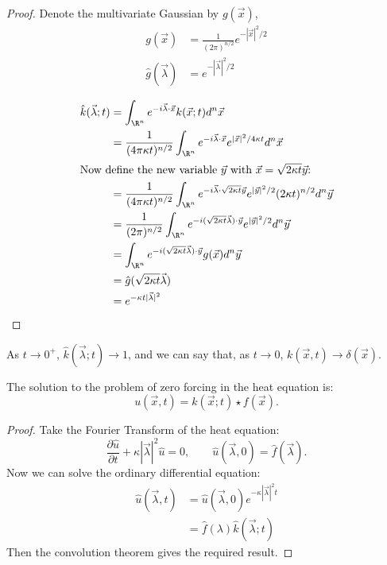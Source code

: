 \documentclass[../Main.tex]{subfiles}
\begin{document}
\begin{proof}
    Denote the multivariate Gaussian by $g(\vec{x})$,
    \begin{align*}
        g(\vec{x}) &= \frac{1}{(2\pi)^{n / 2}} e^{-|\vec{x}|^2 / 2} \\
        \hat{g}(\vec{\lambda}) &= e^{-|\vec{\lambda}|^2 / 2} \\
    \end{align*}
    \begin{align*}
        \hat{k}(\vec{\lambda};t) &= \int_{\R^n} e^{-i \vec{\lambda} \cdot \vec{x}} k(\vec{x};t) d^n\vec{x} \\
        &= \frac{1}{(4\pi \kappa t)^{n/2}} \int_{\R^n} e^{-i \vec{\lambda} \cdot \vec{x}} e^{|\vec{x}|^2 / 4\kappa t} d^n \vec{x} \\
        \intertext{Now define the new variable $\vec{y}$ with $\vec{x} = \sqrt{2\kappa t} \vec{y}$:}
        &= \frac{1}{(4\pi \kappa t)^{n/2}} \int_{\R^n} e^{-i \vec{\lambda} \cdot \sqrt{2 \kappa t}\vec{y}} e^{|\vec{y}|^2 / 2} (2\kappa t)^{n / 2}d^n \vec{y} \\
        &= \frac{1}{(2\pi)^{n/2}} \int_{\R^n} e^{-i (\sqrt{2\kappa t}\vec{\lambda}) \cdot \vec{y}} e^{|\vec{y}|^2 / 2} d^n \vec{y} \\
        &= \int_{\R^n} e^{-i (\sqrt{2\kappa t}\vec{\lambda}) \cdot \vec{y}} g(\vec{x}) d^n \vec{y} \\
        &= \hat{g}(\sqrt{2 \kappa t} \vec{\lambda}) \\
        &= e^{-\kappa t |\vec{\lambda}|^2}
    \end{align*}
\end{proof}
\begin{remark}
    As $t \to 0^+$, $\hat{k}(\vec{\lambda};t) \to 1$, and we can say that, as $t \to 0$, $k(\vec{x}, t) \to \delta(\vec{x})$.
\end{remark}
\begin{proposition}
    The solution to the problem of zero forcing in the heat equation is:
    \begin{equation*}
        u(\vec{x}, t) = k(\vec{x};t) \star f(\vec{x}).
    \end{equation*}
    \label{propHeatUnboundedSoln}
\end{proposition}
\begin{proof}
    Take the Fourier Transform of the heat equation:
    \begin{equation*}
        \frac{\partial \hat{u}}{\partial t} + \kappa |\vec{\lambda}|^2 \hat{u} = 0,\qquad \hat{u}(\vec{\lambda}, 0) = \hat{f}(\vec{\lambda}).
    \end{equation*}
    Now we can solve the ordinary differential equation:
    \begin{align*}
        \hat{u}(\vec{\lambda}, t) &= \hat{u}(\vec{\lambda}, 0) e^{-\kappa |\vec{\lambda}|^2 t} \\
        &= \hat{f}(\lambda) \hat{k}(\vec{\lambda};t)
    \end{align*}
    Then the convolution theorem gives the required result.
\end{proof}
\end{document}
